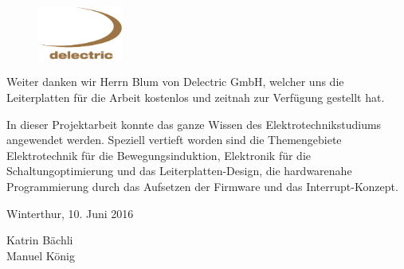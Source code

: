 \begin{figure}[ht]
   \includegraphics[width=0.25\textwidth]{0Vorspann/imag/delectric_logo_gross.png}
   \label{delectric_logo} 
\end{figure}

Weiter danken wir Herrn Blum von Delectric GmbH, welcher uns die Leiterplatten für die Arbeit kostenlos und zeitnah zur Verfügung gestellt hat.

In dieser Projektarbeit konnte das ganze Wissen des Elektrotechnikstudiums angewendet werden. Speziell vertieft worden sind die Themengebiete Elektrotechnik für die Bewegungsinduktion, Elektronik für die Schaltungoptimierung und das Leiterplatten-Design, die hardwarenahe Programmierung durch das Aufsetzen der Firmware und das Interrupt-Konzept. 


Winterthur, 10. Juni 2016


Katrin Bächli\\
Manuel König





